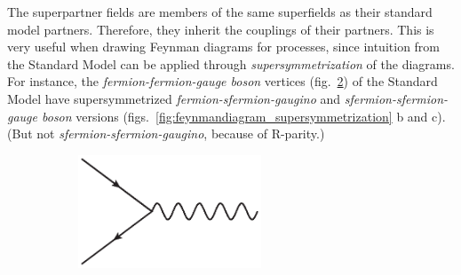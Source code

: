 \documentclass[twoside,english]{uiofysmaster}
\begin{document}
 The superpartner fields are members of the same superfields as their standard model partners. Therefore, they inherit the couplings of their partners. This is very useful when drawing Feynman diagrams for processes, since intuition from the Standard Model can be applied through {\it supersymmetrization} of the diagrams. For instance, the {\it fermion-fermion-gauge boson} vertices (fig.\ \ref{fig:feynmandiagram_supersymmetrization_a}) of the Standard Model have supersymmetrized {\it fermion-sfermion-gaugino} and {\it sfermion-sfermion-gauge boson} versions (figs.\ \ref{fig:feynmandiagram_supersymmetrization} b and c). (But not {\it sfermion-sfermion-gaugino}, because of R-parity.) 
 \begin{figure}[htbp]
	\centering
	\begin{subfigure}[b]{0.45\textwidth}
		\centering
		\includegraphics[width=0.6\textwidth]{figures/susyintro/ffg_vertex.eps}
		\caption{ }
		\label{fig:feynmandiagram_supersymmetrization_a}
	\end{subfigure}


\end{figure}
\end{document}
